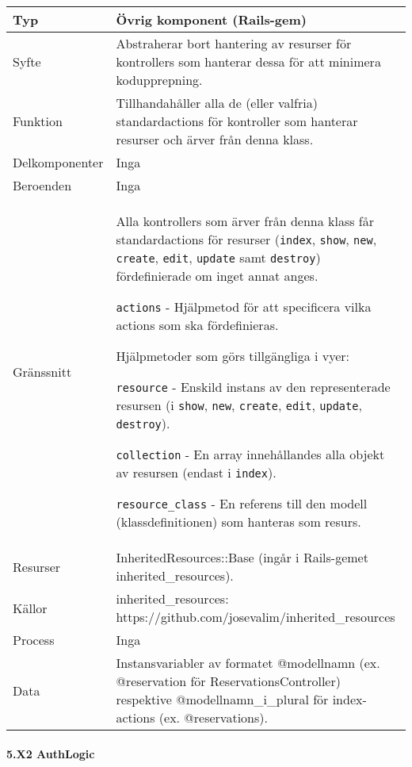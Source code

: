 \documentclass[a4paper, twoside, 11pt, titlepage]{article}
\begin{document}
			\begin {table} [ht] \begin{tabular} {  p{3.5cm} p{9.6cm} }
				\hline
				{Typ} & {Övrig komponent (Rails-gem)} \\
				\hline
				{Syfte} & {Abstraherar bort hantering av resurser för kontrollers som hanterar dessa för att minimera kodupprepning.} \\
				\hline
				{Funktion} & {Tillhandahåller alla de (eller valfria) standardactions för kontroller som hanterar resurser och ärver från denna klass.} \\
				\hline
				{Delkomponenter} & {Inga} \\
				\hline
				{Beroenden} & {Inga} \\
				\hline
				{Gränssnitt} & {Alla kontrollers som ärver från denna klass får standardactions för resurser ({\tt index}, {\tt show}, {\tt new}, {\tt create}, {\tt edit}, {\tt update} samt {\tt destroy}) fördefinierade om inget annat anges.

{\tt actions} - Hjälpmetod för att specificera vilka actions som ska fördefinieras.

Hjälpmetoder som görs tillgängliga i vyer:

{\tt resource} - Enskild instans av den representerade resursen (i {\tt show}, {\tt new}, {\tt create}, {\tt edit}, {\tt update}, {\tt destroy}).

{\tt collection} - En array innehållandes alla objekt av resursen (endast i {\tt index}).

{\tt resource\_class} - En referens till den modell (klassdefinitionen) som hanteras som resurs.} \\
				\hline
				{Resurser} & {InheritedResources::Base (ingår i Rails-gemet inherited\_resources).} \\
				\hline
				{Källor} & {inherited\_resources: https://github.com/josevalim/inherited\_resources} \\
				\hline
				{Process} & {Inga} \\
				\hline
				{Data} & {Instansvariabler av formatet @modellnamn (ex. @reservation för ReservationsController) respektive @modellnamn\_i\_plural för index-actions (ex. @reservations).} \\
				\hline
			\end{tabular} \end{table} \FloatBarrier


			\paragraph{5.X2 AuthLogic}\
\end{document}
